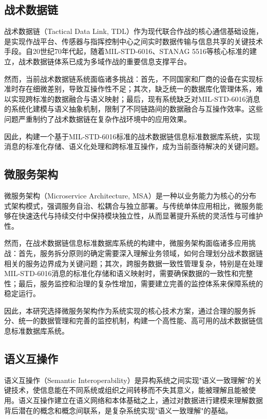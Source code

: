 \subsection{战术数据链}

战术数据链（Tactical Data Link, TDL）作为现代联合作战的核心通信基础设施，是实现作战平台、传感器与指挥控制中心之间实时数据传输与信息共享的关键技术手段。自20世纪70年代起，随着MIL-STD-6016、STANAG 5516等核心标准的建立，战术数据链体系已成为多域作战的重要信息支撑平台。

然而，当前战术数据链系统面临诸多挑战：首先，不同国家和厂商的设备在实现标准时存在细微差别，导致互操作性不足；其次，缺乏统一的数据库化管理体系，难以实现跨标准的数据融合与语义映射；最后，现有系统缺乏对MIL-STD-6016消息的系统化建模与语义抽象机制，限制了不同链路间的数据融合与互操作效率。这些问题严重制约了战术数据链在复杂作战环境中的应用效果。

因此，构建一个基于MIL-STD-6016标准的战术数据链信息标准数据库系统，实现消息的标准化存储、语义化处理和跨标准互操作，成为当前亟待解决的关键问题。

\subsection{微服务架构}

微服务架构（Microservice Architecture, MSA）是一种以业务能力为核心的分布式架构模式，强调服务自治、松耦合与独立部署。与传统单体应用相比，微服务能够在快速迭代与持续交付中保持模块独立性，从而显著提升系统的灵活性与可维护性。

然而，在战术数据链信息标准数据库系统的构建中，微服务架构面临诸多应用挑战：首先，服务拆分原则的确定需要深入理解业务领域，如何合理划分战术数据链相关的服务边界成为关键问题；其次，跨服务数据一致性管理复杂，特别是在处理MIL-STD-6016消息的标准化存储和语义映射时，需要确保数据的一致性和完整性；最后，服务监控和治理的复杂性增加，需要建立完善的监控体系来保障系统的稳定运行。

因此，本研究选择微服务架构作为系统实现的核心技术方案，通过合理的服务拆分、统一的数据管理和完善的监控机制，构建一个高性能、高可用的战术数据链信息标准数据库系统。


\subsection{语义互操作}

语义互操作（Semantic Interoperability）是异构系统之间实现"语义一致理解"的关键技术，使信息能在不同系统或组织之间转移而不失其意义，能被理解且能被使用。语义互操作建立在语义网络和本体基础之上，通过对数据进行建模来理解数据背后潜在的概念和概念间联系，是复杂系统实现"语义一致理解"的基础。

